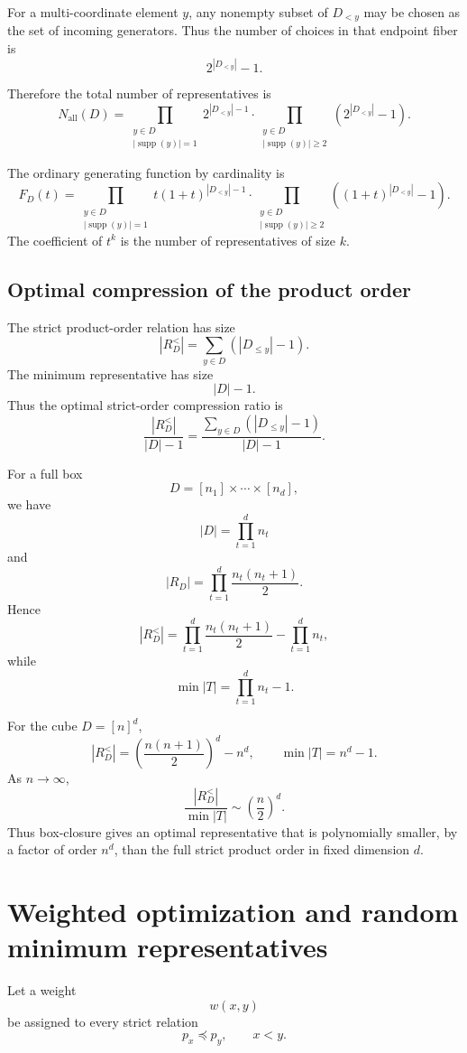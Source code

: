 \documentclass[11pt]{article}
\begin{document}
For a multi-coordinate element $y$, any nonempty subset of $D_{<y}$ may be chosen as the set of incoming generators. Thus the number of choices in that endpoint fiber is
\[
2^{|D_{<y}|}-1.
\]

Therefore the total number of representatives is
\[
N_{\mathrm{all}}(D)
=
\prod_{\substack{y\in D\\ |\operatorname{supp}(y)|=1}}
2^{|D_{<y}|-1}
\cdot
\prod_{\substack{y\in D\\ |\operatorname{supp}(y)|\ge2}}
\left(2^{|D_{<y}|}-1\right).
\]

The ordinary generating function by cardinality is
\[
F_D(t)
=
\prod_{\substack{y\in D\\ |\operatorname{supp}(y)|=1}}
t(1+t)^{|D_{<y}|-1}
\cdot
\prod_{\substack{y\in D\\ |\operatorname{supp}(y)|\ge2}}
\left((1+t)^{|D_{<y}|}-1\right).
\]
The coefficient of $t^k$ is the number of representatives of size $k$.

\subsection{Optimal compression of the product order}

The strict product-order relation has size
\[
|R_D^{<}|
=
\sum_{y\in D}(|D_{\le y}|-1).
\]
The minimum representative has size
\[
|D|-1.
\]
Thus the optimal strict-order compression ratio is
\[
\frac{|R_D^{<}|}{|D|-1}
=
\frac{\sum_{y\in D}(|D_{\le y}|-1)}{|D|-1}.
\]

For a full box
\[
D=[n_1]\times\cdots\times[n_d],
\]
we have
\[
|D|=\prod_{t=1}^{d}n_t
\]
and
\[
|R_D|
=
\prod_{t=1}^{d}\frac{n_t(n_t+1)}2.
\]
Hence
\[
|R_D^{<}|
=
\prod_{t=1}^{d}\frac{n_t(n_t+1)}2
-
\prod_{t=1}^{d}n_t,
\]
while
\[
\min |T|=\prod_{t=1}^{d}n_t-1.
\]

For the cube $D=[n]^d$,
\[
|R_D^{<}|=
\left(\frac{n(n+1)}2\right)^d-n^d,
\qquad
\min |T|=n^d-1.
\]
As $n\to\infty$,
\[
\frac{|R_D^{<}|}{\min |T|}
\sim
\left(\frac n2\right)^d.
\]
Thus box-closure gives an optimal representative that is polynomially smaller, by a factor of order $n^d$, than the full strict product order in fixed dimension $d$.

\section{Weighted optimization and random minimum representatives}

Let a weight
\[
w(x,y)
\]
be assigned to every strict relation
\[
p_x\preceq p_y,\qquad x<y.
\]
\end{document}
